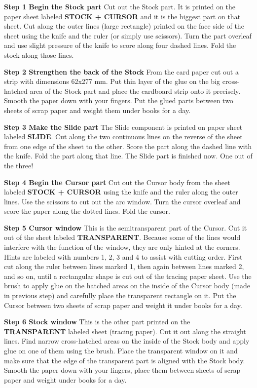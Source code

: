 \begin{multicols*}{3}
{  \textbf{Step 1 Begin the Stock part} Cut out the Stock part. It is printed on the paper sheet labeled \textbf{STOCK + CURSOR} and it is the biggest part on that sheet. Cut along the outer lines (large rectangle) printed on the face side of the sheet using the knife and the ruler (or simply use scissors). Turn the part overleaf and use slight pressure of the knife to score along four dashed lines. Fold the stock along those lines.

  \textbf{Step 2 Strengthen the back of the Stock} From the card paper cut out a strip with dimensions 62x277 mm. Put thin layer of the glue on the big cross-hatched area of the Stock part and place the cardboard strip onto it precisely. Smooth the paper down with your fingers. Put the glued parts between two sheets of scrap paper and weight them under books for a day.

  \textbf{Step 3 Make the Slide part} The Slide component is printed on paper sheet labeled \textbf{SLIDE}. Cut along the two continuous lines on the reverse of the sheet from one edge of the sheet to the other. Score the part along the dashed line with the knife. Fold the part along that line. The Slide part is finished now. One out of the three!

  \textbf{Step 4 Begin the Cursor part} Cut out the Cursor body from the sheet labeled \textbf{STOCK + CURSOR} using the knife and the ruler along the outer lines. Use the scissors to cut out the arc window. Turn the cursor overleaf and score the paper along the dotted lines. Fold the cursor.

  \textbf{Step 5 Cursor window} This is the semitransparent part of the Cursor. Cut it out of the sheet labeled \textbf{TRANSPARENT}. Because some of the lines would interfere with the function of the window, they are only hinted at the corners. Hints are labeled with numbers 1, 2, 3 and 4 to assist with cutting order. First cut along the ruler between lines marked 1, then again between lines marked 2, and so on, until a rectangular shape is cut out of the tracing paper sheet. Use the brush to apply glue on the hatched areas on the inside of the Cursor body (made in previous step) and carefully place the transparent rectangle on it. Put the Cursor between two sheets of scrap paper and weight it under books for a day.

  \textbf{Step 6 Stock window} This is the other part printed on the \textbf{TRANSPARENT} labeled sheet (tracing paper). Cut it out along the straight lines. Find narrow cross-hatched areas on the inside of the Stock body and apply glue on one of them using the brush. Place the transparent window on it and make sure that the edge of the transparent part is aligned with the Stock body. Smooth the paper down with your fingers, place them between sheets of scrap paper and weight under books for a day.

}
\end{multicols*}
